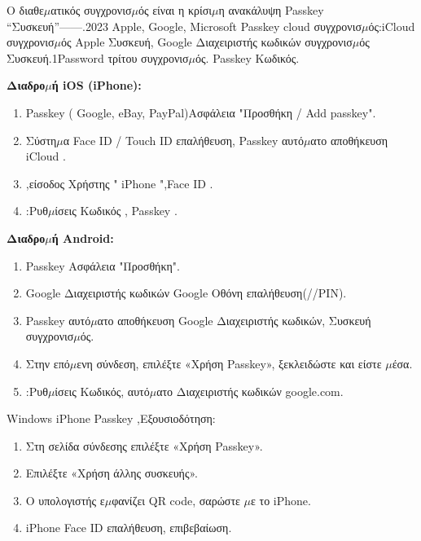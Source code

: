 \begin{tcbinfo}{Ο διαθε$\mu$ατικός συγχρονισ$\mu$ός είναι η κρίσι$\mu$η ανακάλυψη}
Passkey “Συσκευή”——.2023 Apple, Google, Microsoft Passkey cloud συγχρονισ$\mu$ός:iCloud συγχρονισ$\mu$ός Apple Συσκευή, Google Διαχειριστής κωδικών συγχρονισ$\mu$ός Συσκευή.1Password τρίτου συγχρονισ$\mu$ός. Passkey Κωδικός.

\end{tcbinfo}


\textbf{Διαδρο$\mu$ή iOS (iPhone):}

\begin{enumerate}
  \item Passkey ( Google, eBay, PayPal)Ασφάλεια "Προσθήκη / Add passkey".
  \item Σύστη$\mu$α Face ID / Touch ID επαλήθευση, Passkey αυτό$\mu$ατο αποθήκευση iCloud .
  \item ,είσοδος Χρήστης " iPhone ",Face ID .
  \item :Ρυθ$\mu$ίσεις Κωδικός , Passkey .
\end{enumerate}

\textbf{Διαδρο$\mu$ή Android:}

\begin{enumerate}
  \item Passkey Ασφάλεια "Προσθήκη".
  \item Google Διαχειριστής κωδικών Google Οθόνη επαλήθευση(//PIN).
  \item Passkey αυτό$\mu$ατο αποθήκευση Google Διαχειριστής κωδικών, Συσκευή συγχρονισ$\mu$ός.
  \item Στην επό$\mu$ενη σύνδεση, επιλέξτε «Χρήση Passkey», ξεκλειδώστε και είστε $\mu$έσα.
  \item :Ρυθ$\mu$ίσεις Κωδικός, αυτό$\mu$ατο Διαχειριστής κωδικών google.com.
\end{enumerate}


Windows iPhone Passkey ,Εξουσιοδότηση:

\begin{enumerate}
  \item Στη σελίδα σύνδεσης επιλέξτε «Χρήση Passkey».
  \item Επιλέξτε «Χρήση άλλης συσκευής».
  \item Ο υπολογιστής ε$\mu$φανίζει QR code, σαρώστε $\mu$ε το iPhone.
  \item iPhone Face ID επαλήθευση, επιβεβαίωση.
\end{enumerate}

